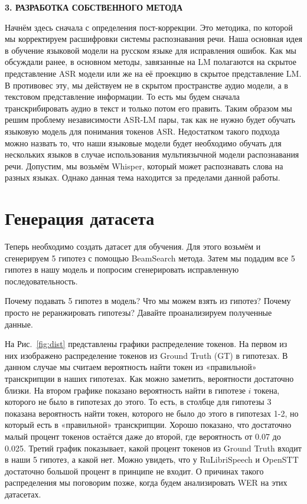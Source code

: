 \newpage
\begin{center}
  \textbf{\large 3. РАЗРАБОТКА СОБСТВЕННОГО МЕТОДА}
\end{center}

Начнём здесь сначала с определения пост-коррекции.
Это методика, по которой мы корректируем расшифровки системы распознавания речи.
Наша основная идея в обучение языковой модели на русском языке для исправления ошибок.
Как мы обсуждали ранее, в основном методы, завязанные на LM полагаются на скрытое представление ASR модели или же на её проекцию в скрытое представление LM.
В противовес эту, мы действуем не в скрытом пространстве аудио модели, а в текстовом представление информации.
То есть мы будем сначала транскрибировать аудио в текст и только потом его править.
Таким образом мы решим проблему независимости ASR-LM пары, так как не нужно будет обучать языковую модель для понимания токенов ASR.
Недостатком такого подхода можно назвать то, что наши языковые модели будет необходимо обучать для нескольких языков в случае использования мультиязычной модели распознавания речи.
Допустим, мы возьмём Whisper, который может распознавать слова на разных языках.
Однако данная тема находится за пределами данной работы.

\section{Генерация датасета}
Теперь необходимо создать датасет для обучения.
Для этого возьмём и сгенерируем 5 гипотез с помощью BeamSearch метода\cite{chen2023hyporadise}.
Затем мы подадим все 5 гипотез в нашу модель и попросим сгенерировать исправленную последовательность.

Почему подавать 5 гипотез в модель? Что мы можем взять из гипотез?
Почему просто не реранжировать гипотезы?
Давайте проанализируем полученные данные.

На Рис.~\ref{fig:dist} представлены графики распределение токенов.
На первом из них изображено распределение токенов из Ground Truth (GT) в гипотезах.
В данном случае мы считаем вероятность найти токен из «правильной» транскрипции в наших гипотезах.
Как можно заметить, вероятности достаточно близки.
На втором графике показано вероятность найти в гипотезе $i$ токена, которого не было в гипотезах до этого.
То есть, в столбце для гипотезы 3 показана вероятность найти токен, которого не было до этого в гипотезах 1-2, но который есть в «правильной» транскрипции.
Хорошо показано, что достаточно малый процент токенов остаётся даже до второй, где вероятность от 0.07 до 0.025.
Третий график показывает, какой процент токенов из Ground Truth входит в наши 5 гипотез, а какой нет.
Можно увидеть, что у RuLibriSpeech и OpenSTT достаточно большой процент в принципе не входит.
О причинах такого распределения мы поговорим позже, когда будем анализировать WER на этих датасетах.

